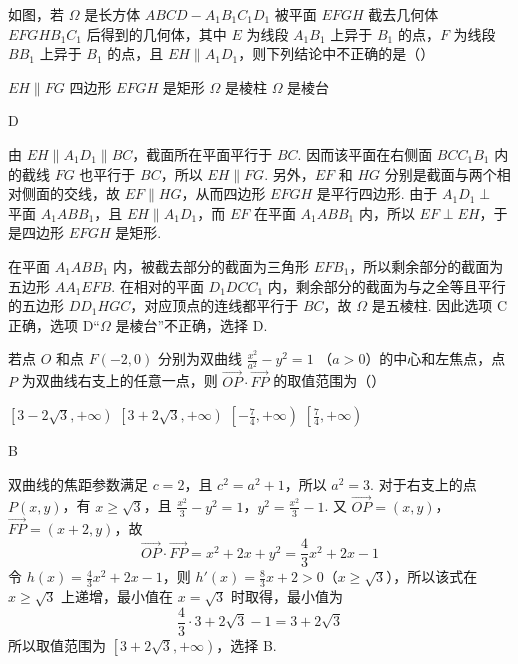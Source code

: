 \begin{problem}
如图，若 \(\Omega\) 是长方体 \(ABCD - A_{1}B_{1}C_{1}D_{1}\) 被平面 \(EFGH\) 截去几何体 \(EFGHB_{1}C_{1}\) 后得到的几何体，其中 \(E\) 为线段 \(A_{1}B_{1}\) 上异于 \(B_{1}\) 的点，\(F\) 为线段 \(BB_{1}\) 上异于 \(B_{1}\) 的点，且 \(EH \parallel A_{1}D_{1}\)，则下列结论中不正确的是（\quad）


\choices
    {\(EH \parallel FG\)}
    {四边形 \(EFGH\) 是矩形}
    {\(\Omega\) 是棱柱}
    {\(\Omega\) 是棱台}
\end{problem}

\begin{answer}
D
\end{answer}

\begin{solution}
由 \(EH\parallel A_{1}D_{1}\parallel BC\)，截面所在平面平行于 \(BC\). 因而该平面在右侧面 \(BCC_{1}B_{1}\) 内的截线 \(FG\) 也平行于 \(BC\)，所以 \(EH\parallel FG\). 另外，\(EF\) 和 \(HG\) 分别是截面与两个相对侧面的交线，故 \(EF\parallel HG\)，从而四边形 \(EFGH\) 是平行四边形. 由于 \(A_{1}D_{1}\perp\) 平面 \(A_{1}ABB_{1}\)，且 \(EH\parallel A_{1}D_{1}\)，而 \(EF\) 在平面 \(A_{1}ABB_{1}\) 内，所以 \(EF\perp EH\)，于是四边形 \(EFGH\) 是矩形.

在平面 \(A_{1}ABB_{1}\) 内，被截去部分的截面为三角形 \(EFB_{1}\)，所以剩余部分的截面为五边形 \(AA_{1}EFB\). 在相对的平面 \(D_{1}DCC_{1}\) 内，剩余部分的截面为与之全等且平行的五边形 \(DD_{1}HGC\)，对应顶点的连线都平行于 \(BC\)，故 \(\Omega\) 是五棱柱. 因此选项 C 正确，选项 D“\(\Omega\) 是棱台”不正确，选择 D.
\end{solution}

\begin{problem}
若点 \(O\) 和点 \(F(-2,0)\) 分别为双曲线 \(\frac{x^2}{a^2} - y^2 = 1\) （\(a > 0\)）的中心和左焦点，点 \(P\) 为双曲线右支上的任意一点，则 \(\overrightarrow{OP} \cdot \overrightarrow{FP}\) 的取值范围为（\quad）

\choices
    {\(\left[3 - 2\sqrt{3}, +\infty\right)\)}
    {\(\left[3 + 2\sqrt{3}, + \infty\right)\)}
    {\(\left[-\frac{7}{4}, +\infty\right)\)}
    {\(\left[\frac{7}{4}, +\infty\right)\)}
\end{problem}

\begin{answer}
B
\end{answer}

\begin{solution}
双曲线的焦距参数满足 \(c=2\)，且 \(c^{2}=a^{2}+1\)，所以 \(a^{2}=3\). 对于右支上的点 \(P(x,y)\)，有 \(x\geqslant\sqrt{3}\)，且
\(\frac{x^{2}}{3}-y^{2}=1\)，\(y^{2}=\frac{x^{2}}{3}-1\).
又 \(\overrightarrow{OP}=(x,y)\)，\(\overrightarrow{FP}=(x+2,y)\)，故
\[
\overrightarrow{OP}\cdot\overrightarrow{FP}=x^{2}+2x+y^{2}=\frac{4}{3}x^{2}+2x-1
\]
令 \(h(x)=\frac{4}{3}x^{2}+2x-1\)，则 \(h'(x)=\frac{8}{3}x+2>0\)（\(x\geqslant\sqrt{3}\)），所以该式在 \(x\geqslant\sqrt{3}\) 上递增，最小值在 \(x=\sqrt{3}\) 时取得，最小值为
\[
\frac{4}{3}\cdot3+2\sqrt{3}-1=3+2\sqrt{3}
\]
所以取值范围为 \(\left[3+2\sqrt{3},+\infty\right)\)，选择 B.
\end{solution}


